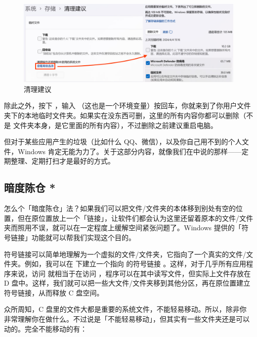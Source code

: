 {\begin{figure}[htb!]
  \centering
  \includegraphics[width=.9\textwidth]{assets/advanced/Clean_Suggestion.jpg}
  \caption{清理建议}
  \label{fig:Clean_Suggestion}
\end{figure}

除此之外，按下 ，输入 \hspace{1pt}（这也是一个环境变量）按回车，你就来到了你用户文件夹下的本地临时文件夹。如果实在没东西可删，这里的所有内容你都可以删除（不是  文件夹本身，是它里面的所有内容），不过删除之前建议重启电脑。

但对于某些应用产生的垃圾（比如什么 QQ、微信），以及你自己用不到的个人文件，Windows 肯定无能为力了。关于这部分内容，就像我们在中说的那样——定期整理、定期打扫才是最好的方式。

\subsection{暗度陈仓 *}

怎么个「暗度陈仓」法？如果我们可以把文件/文件夹的本体移到别处有空的位置，但在原位置放上一个「链接」，让软件们都会认为这里还留着原本的文件/文件夹而照用不误，就可以在一定程度上缓解空间紧张问题了。Windows 提供的「符号链接」功能就可以帮我们实现这个目的。

符号链接可以简单地理解为一个虚拟的文件/文件夹，它指向了一个真实的文件/文件夹。例如，我可以在  下建立一个指向  的符号链接 。这样，对于几乎所有应用程序来说，访问  就相当于在访问 ，程序可以在其中读写文件，但实际上文件存放在 D 盘中。这样，我们就可以把一些大文件/文件夹移到其他分区，再在原位置建立符号链接，从而释放 C 盘空间。

众所周知，C 盘里的文件大都是重要的系统文件，不能轻易移动。所以，除非你非常理解你在做什么。不过说是「不能轻易移动」，但其实有一些文件夹还是可以动的。完全不能移动的有：

}
